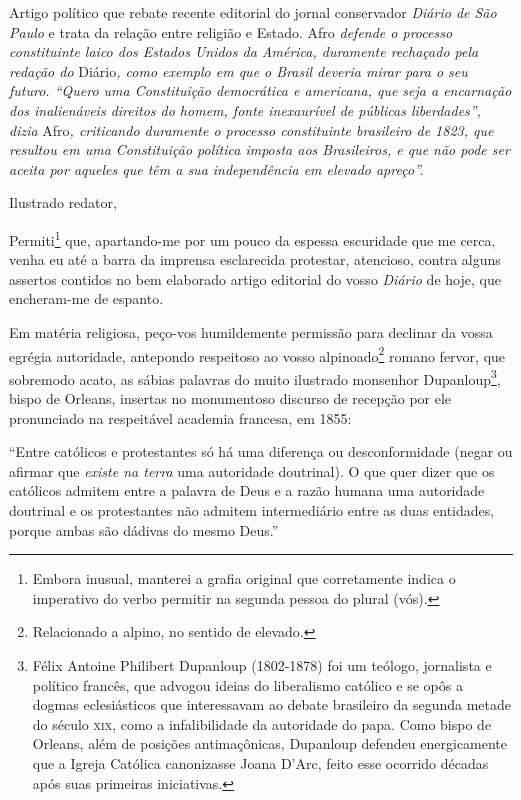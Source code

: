 \begin{didascalia}
Artigo político que rebate recente editorial do jornal conservador\emph{
Diário de São Paulo }e trata da relação entre religião e Estado. Afro
\emph{defende o processo constituinte laico dos Estados Unidos da
América, duramente rechaçado pela redação do} Diário\emph{, como exemplo
em que o Brasil deveria mirar para o seu futuro. ``Quero uma Constituição
democrática e americana, que seja a encarnação dos inalienáveis direitos
do homem, fonte inexaurível de públicas liberdades'', dizia} Afro\emph{,
criticando duramente o processo constituinte brasileiro de 1823, que
resultou em uma Constituição política imposta aos Brasileiros, e que não
pode ser aceita por aqueles que têm a sua independência em elevado
apreço''.}
\end{didascalia}



Ilustrado redator,

Permiti\footnote{Embora inusual, manterei a grafia original que
  corretamente indica o imperativo do verbo permitir na segunda pessoa
  do plural (vós).} que, apartando-me por um pouco da espessa escuridade
que me cerca, venha eu até a barra da imprensa esclarecida protestar,
atencioso, contra alguns assertos contidos no bem elaborado artigo
editorial do vosso \emph{Diário} de hoje, que encheram-me de espanto.

Em matéria religiosa, peço-vos humildemente permissão para declinar da
vossa egrégia autoridade, antepondo respeitoso ao vosso
alpinoado\footnote{Relacionado a alpino, no sentido de elevado.}
romano fervor, que sobremodo acato, as sábias palavras do muito
ilustrado monsenhor Dupanloup\footnote{Félix Antoine Philibert
  Dupanloup (1802-1878) foi um teólogo, jornalista e político francês,
  que advogou ideias do liberalismo católico e se opôs a dogmas
  eclesiásticos que interessavam ao debate brasileiro da segunda metade
  do século \textsc{xix}, como a infalibilidade da autoridade do papa. Como bispo
  de Orleans, além de posições antimaçônicas, Dupanloup defendeu
  energicamente que a Igreja Católica canonizasse Joana D'Arc, feito
  esse ocorrido décadas após suas primeiras iniciativas.}, bispo de
Orleans, insertas no monumentoso discurso de recepção por ele
pronunciado na respeitável academia francesa, em 1855:

``Entre católicos e protestantes só há uma diferença ou desconformidade
(negar ou afirmar que \emph{existe na terra} uma autoridade doutrinal).
O que quer dizer que os católicos admitem entre a palavra de Deus e a
razão humana uma autoridade doutrinal e os protestantes não admitem
intermediário entre as duas entidades, porque ambas são dádivas do mesmo
Deus.''

